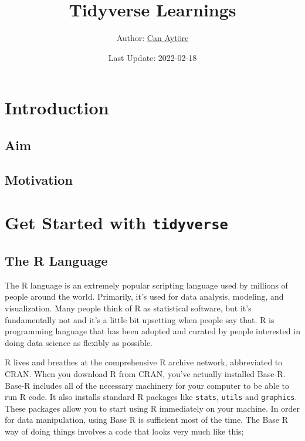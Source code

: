 \documentclass[
]{article}
\title{Tidyverse Learnings}
\author{Author: \href{https://github.com/canaytore/}{Can Aytöre}}
\date{Last Update: 2022-02-18}
\begin{document}
\maketitle

{
\setcounter{tocdepth}{2}
\tableofcontents
}
\hypertarget{introduction}{%
\section{Introduction}\label{introduction}}

\hypertarget{aim}{%
\subsection{Aim}\label{aim}}

\hypertarget{motivation}{%
\subsection{Motivation}\label{motivation}}

\hypertarget{get-started-with-tidyverse}{%
\section{\texorpdfstring{Get Started with \texttt{tidyverse}}{Get Started with tidyverse}}\label{get-started-with-tidyverse}}

\hypertarget{the-r-language}{%
\subsection{The R Language}\label{the-r-language}}

The R language is an extremely popular scripting language used by millions of people around the world. Primarily, it's used for data analysis, modeling, and visualization. Many people think of R as statistical software, but it's fundamentally not and it's a little bit upsetting when people say that. R is programming language that has been adopted and curated by people interested in doing data science as flexibly as possible.

R lives and breathes at the comprehensive R archive network, abbreviated to CRAN. When you download R from CRAN, you've actually installed Base-R. Base-R includes all of the necessary machinery for your computer to be able to run R code. It also installs standard R packages like \texttt{stats}, \texttt{utils} and \texttt{graphics}. These packages allow you to start using R immediately on your machine. In order for data manipulation, using Base R is sufficient most of the time. The Base R way of doing things involves a code that looks very much like this;
\end{document}
